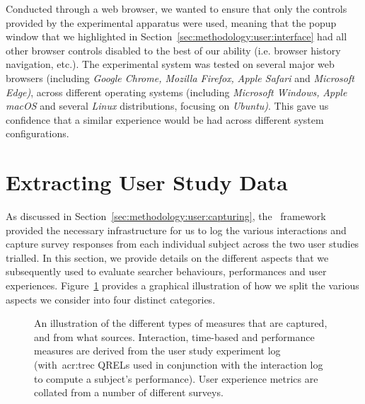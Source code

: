 Conducted through a web browser, we wanted to ensure that only the controls provided by the experimental apparatus were used, meaning that the popup window that we highlighted in Section~\ref{sec:methodology:user:interface} had all other browser controls disabled to the best of our ability (i.e. browser history navigation, etc.). The experimental system was tested on several major web browsers (including \emph{Google Chrome, Mozilla Firefox,} \emph{Apple Safari} and \emph{Microsoft Edge)}, across different operating systems (including \emph{Microsoft Windows,} \emph{Apple macOS} and several \emph{Linux} distributions, focusing on \emph{Ubuntu)}. This gave us confidence that a similar experience would be had across different system configurations.

\section{Extracting User Study Data}\label{sec:methodology:extracting}
As discussed in Section~\ref{sec:methodology:user:capturing}, the \treconomics~framework provided the necessary infrastructure for us to log the various interactions and capture survey responses from each individual subject across the two user studies trialled. In this section, we provide details on the different aspects that we subsequently used to evaluate searcher behaviours, performances and user experiences. Figure~\ref{fig:evaluation_methodology} provides a graphical illustration of how we split the various aspects we consider into four distinct categories.

\begin{figure}[t!]
    \centering
    \caption[Examples of evaluation measures]{An illustration of the different types of measures that are captured, and from what sources. Interaction, time-based and performance measures are derived from the user study experiment log (with~\gls{acr:trec} QRELs used in conjunction with the interaction log to compute a subject's performance). User experience metrics are collated from a number of different surveys.}
    \label{fig:evaluation_methodology}
\end{figure}

